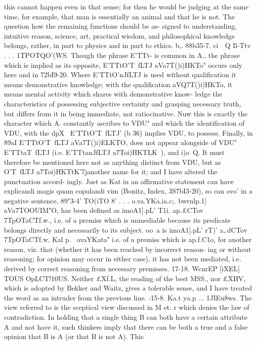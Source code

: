 {{{{{{{{{{{{{{{{{{{{{{{{{{{{{{{{{{{{{{{this cannot happen even in that sense; for then he would be
judging at the same time, for example, that man is essentially an
animal and that he is not.
The question how the remaining functions should be as-
signed to understanding, intuitive reason, science, art, practical
wisdom, and philosophical knowledge belongs, rather, in part to
physics and in part to ethics.
b,.
88b35-7.
ci~~Q
Il-Ttv . . . 1TPOTQO'(WS. Though the phrase E'TTt-
is common in A., the phrase which is implied
as its opposite, E'TTtO'T~fLTJ aVa7T()i)HKTo" occurs only here and in
72bI9-20. Where E'TTtO'nJfLTJ is used without qualification it means
demonstrative knowledge; with the qualification aVQ7T()i)HKTo, it
means mental activity which shares with demonstrative know-
ledge the characteristics of possessing subjective certainty and
grasping necessary truth, but differs from it in being immediate,
not ratiocinative. Nuw this is exactly the character which A.
constantly ascribes to VDU" and which the identification of VDU,
with the dpX~ E'TTtO'T~fLTJ' (b 36) implies VDU, to possess. Finally, in
89aI E'TTtO'T~fLTJ aVa7T()i)ELKTO, does not appear alongside of VDU"
E'TTtaT~fLTJ (i.e. E'TTtanJfLTJ a7Toi)HKTLK~), and i)o~Q. It must therefore
be mentioned here not as anything distinct from VDU, but as
O'T~fLTJ a7Toi)HKTtK'7janother name for it; and I have altered the punctuation accord-
ingly. Just as Kat in an affirmative statement can have explicandi
magis quam copulandi vim (Bonitz, Index, 3S7bI3-20), so can ovo'
in a negative sentence.
89"3-4' TO(iTO 8' . . . o.va.YKa.ia.c;. bwrnlp.1] aVa7TOOUIM"O, has
been defined as imoA1].pL' T1i. ap.£CTov 7TpOTaCTf.w., i.e. of a premiss
which is unmediable because its predicate belongs directly and
necessarily to its subject. oo~a is imoA1].pL' rT)' a,.dCTov 7TpOTaCTf.w.
Kal p.~ avaYKata" i.e. of a premiss which is ap.f.C1o, for another
reason, viz. that (whether it has been reached by incorrect reason-
ing or without reasoning; for opinion may occur in either case),
it has not been mediated, i.e. derived by correct reasoning from
necessary premisses.
17-18. WcnrEP [iXEL] TOUS OpLCT!10US. Neither £Xf.L, the reading
of the best MSS., nor £XHV, which is adopted by Bekker and
Waitz, gives a tolerable sense, and I have treated the word as an
intruder from the previous line.
:15-8. Ka.t ya.p ... 1JIEu8ws. The view referred to is the sceptical
view discussed in M et. r which denies the law of contradiction.
In holding that a single thing B can both have a certain attribute
A and not have it, such thinkers imply that there can be both
a true and a false opinion that B is A (or that B is not A). This
}}}}}}}}}}}}}}}}}}}}}}}}}}}}}}}}}}}}}}}
